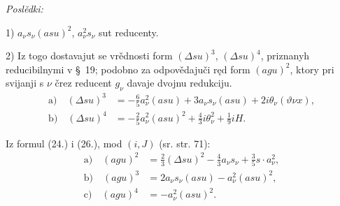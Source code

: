 \documentclass[11pt]{article}
\begin{document}
\noindent\textit{Poslědki:}

1) $a_{\nu}s_{\nu}(asu)^2$, $a_{\nu}^2s_{\nu}$ sut reducenty.

2) Iz togo dostavajut se vrědnosti form $(\Delta su)^3$, $(\Delta su)^4$, priznanyh reducibilnymi v \S\ 19; podobno za odpovědajuči ręd form $(agu)^2$, ktory pri svijanji s $\nu$ črez reducent $g_{\nu}$ davaje dvojnu redukciju.
\[
\tag{26}
\begin{aligned}
\mathrm{a)}\quad (\Delta su)^3&=-\frac65a_{\nu}^2(asu)+3a_{\nu}s_{\nu}(asu)+2i\theta_{\nu}(\vartheta\nu x),\\
\mathrm{b)}\quad (\Delta su)^4&=-\frac25a_{\nu}^2(asu)^2+\frac43i\theta_{\nu}^2+\frac19iH.
\end{aligned}
\]

Iz formul (24.) i (26.), mod $(i,J)$ (sr. str. 71):
\[
\tag{27}
\begin{aligned}
\mathrm{a)}\quad (agu)^2&=\frac23(\Delta su)^2-\frac43a_{\nu}s_{\nu}+\frac35s\cdot a_{\nu}^2,\\
\mathrm{b)}\quad (agu)^3&=2a_{\nu}s_{\nu}(asu)-a_{\nu}^2(asu)^2,\\
\mathrm{c)}\quad (agu)^4&=-a_{\nu}^2(asu)^2.
\end{aligned}
\]
\end{document}
